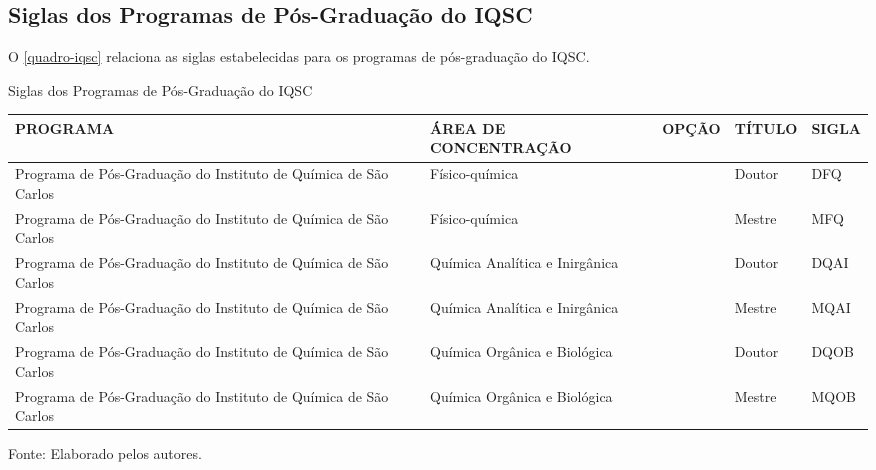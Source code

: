 \begin{apendicesenv}
\chapter{Siglas dos Programas de Pós-Graduação do IQSC}
O \autoref{quadro-iqsc} relaciona as siglas estabelecidas para os programas de pós-graduação do IQSC.
\begin{quadro}[htb]
\ABNTEXfontereduzida
\caption[Siglas dos Programas de Pós-Graduação do IQSC]{Siglas dos Programas de Pós-Graduação do IQSC}
\label{quadro-iqsc}
\begin{tabular}{|p{3.5cm}|p{3.5cm}|p{3.5cm}|p{1.5cm}|p{2.25cm}|}
  \hline
   \textbf{PROGRAMA} & \textbf{ÁREA DE CONCENTRAÇÃO} & \textbf{OPÇÃO} & \textbf{TÍTULO} & \textbf{SIGLA}  \\
    \hline
Programa de Pós-Graduação do Instituto de Química de São Carlos & Físico-química &  & Doutor & DFQ\\
Programa de Pós-Graduação do Instituto de Química de São Carlos & Físico-química &  & Mestre & MFQ\\
Programa de Pós-Graduação do Instituto de Química de São Carlos & Química Analítica e Inirgânica &  & Doutor & DQAI\\
Programa de Pós-Graduação do Instituto de Química de São Carlos & Química Analítica e Inirgânica &  & Mestre & MQAI\\
Programa de Pós-Graduação do Instituto de Química de São Carlos & Química Orgânica e Biológica &  & Doutor & DQOB\\
Programa de Pós-Graduação do Instituto de Química de São Carlos & Química Orgânica e Biológica &  & Mestre & MQOB\\
\hline

\end{tabular}
\begin{flushleft}
		Fonte: Elaborado pelos autores.\
\end{flushleft}
\end{quadro}



\end{apendicesenv}

